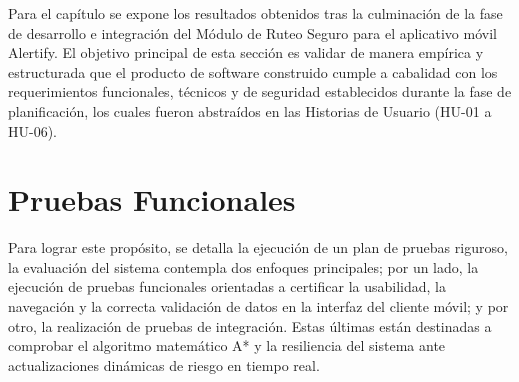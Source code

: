 Para el capítulo se expone los resultados obtenidos tras la culminación de la fase de desarrollo e integración del Módulo de Ruteo Seguro para el aplicativo móvil Alertify. El objetivo principal de esta sección es validar de manera empírica y estructurada que el producto de software construido cumple a cabalidad con los requerimientos funcionales, técnicos y de seguridad establecidos durante la fase de planificación, los cuales fueron abstraídos en las Historias de Usuario (HU-01 a HU-06).

\section{Pruebas Funcionales}
Para lograr este propósito, se detalla la ejecución de un plan de pruebas riguroso, la evaluación del sistema contempla dos enfoques principales; por un lado, la ejecución de pruebas funcionales orientadas a certificar la usabilidad, la navegación y la correcta validación de datos en la interfaz del cliente móvil; y por otro, la realización de pruebas de integración. Estas últimas están destinadas a comprobar el algoritmo matemático A* y  la resiliencia del sistema ante actualizaciones dinámicas de riesgo en tiempo real.


